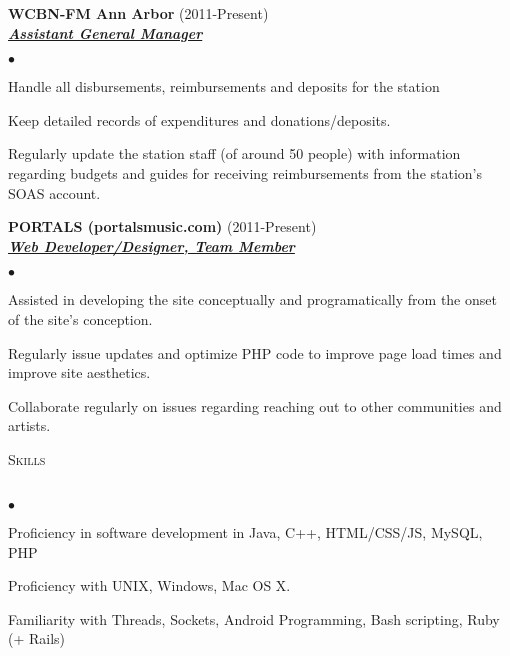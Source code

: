 \documentclass{article}
\newcommand{\lineunder}{\vspace*{-8pt} \\ \hspace*{-18pt} \hrulefill \\}
\newcommand{\header}[1]{{\hspace*{-15pt}\vspace*{6pt} \textsc{#1}} \vspace*{-6pt} \lineunder}
\newcommand{\employer}[3]{{ \textbf{#1} (#2)\\ \underline{\textbf{\emph{#3}}}\\  }}
\newenvironment{achievements}{\begin{list}{$\bullet$}{\topsep 0pt \itemsep -2pt}}{\vspace*{4pt}\end{list}}
\begin{document}
\employer{WCBN-FM Ann Arbor}{2011-Present} {Assistant General Manager}
	\begin{achievements}
	\item Handle all disbursements, reimbursements and deposits for the station
	\item Keep detailed records of expenditures and donations/deposits.
	\item Regularly update the station staff (of around 50 people) with information regarding budgets and guides for receiving reimbursements from the station's SOAS account.
	\end{achievements}

\employer{PORTALS (portalsmusic.com)}{2011-Present}{Web Developer/Designer, Team Member}
	\begin{achievements}
	\item Assisted in developing the site conceptually and programatically from the onset of the site's conception.
	\item Regularly issue updates and optimize PHP code to improve page load times and improve site aesthetics.
	\item Collaborate regularly on issues regarding reaching out to other communities and artists.
	\end{achievements}

\header{Skills}
\begin{achievements}
\item Proficiency in software development in Java, C++, HTML/CSS/JS, MySQL, PHP
\item Proficiency with UNIX, Windows, Mac OS X.
\item Familiarity with Threads, Sockets, Android Programming, Bash scripting, Ruby (+ Rails)   

\end{achievements}
\end{document}
